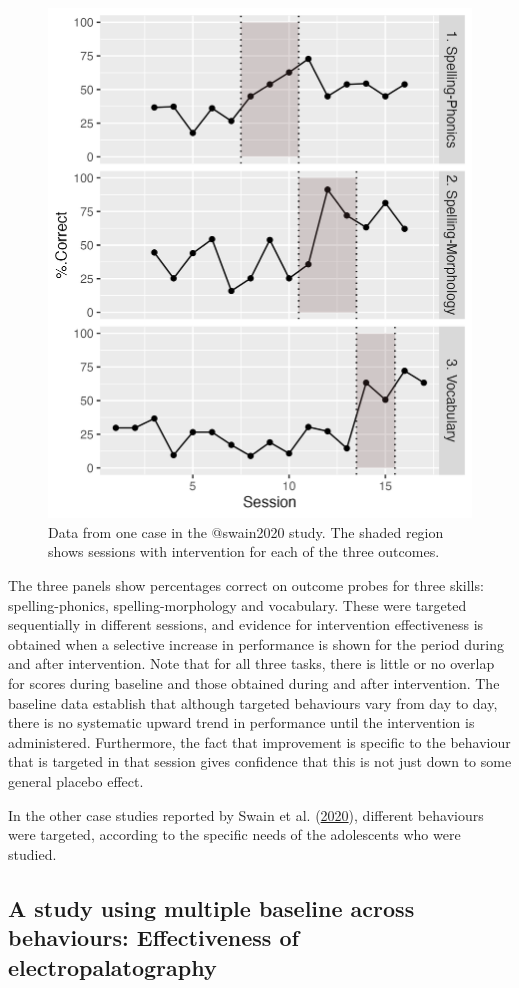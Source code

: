 \documentclass{krantz}
\begin{document}
\begin{figure}
\includegraphics[width=0.6\linewidth]{images_bw/swainplot} \caption{Data from one case in the @swain2020 study. The shaded region shows sessions with intervention for each of the three outcomes.}\label{fig:swainfig}
\end{figure}

The three panels show percentages correct on outcome probes for three skills: spelling-phonics, spelling-morphology and vocabulary. These were targeted sequentially in different sessions, and evidence for intervention effectiveness is obtained when a selective increase in performance is shown for the period during and after intervention. Note that for all three tasks, there is little or no overlap for scores during baseline and those obtained during and after intervention. The baseline data establish that although targeted behaviours vary from day to day, there is no systematic upward trend in performance until the intervention is administered. Furthermore, the fact that improvement is specific to the behaviour that is targeted in that session gives confidence that this is not just down to some general placebo effect.

In the other case studies reported by Swain et al. (\protect\hyperlink{ref-swain2020}{2020}), different behaviours were targeted, according to the specific needs of the adolescents who were studied.

\hypertarget{a-study-using-multiple-baseline-across-behaviours-effectiveness-of-electropalatography}{%
\subsection{A study using multiple baseline across behaviours: Effectiveness of electropalatography}\label{a-study-using-multiple-baseline-across-behaviours-effectiveness-of-electropalatography}}
\end{document}
